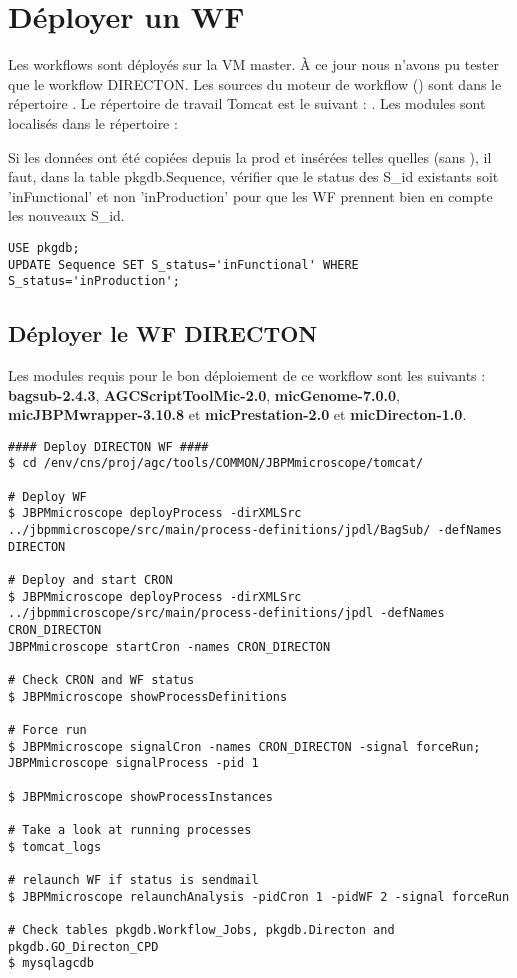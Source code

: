 \section{Déployer un WF} \label{sec:deployer_wf}

Les workflows sont déployés sur la VM master.
À ce jour nous n'avons pu tester que le workflow DIRECTON.
Les sources du moteur de workflow () sont dans le répertoire .
Le répertoire de travail Tomcat est le suivant : .
Les modules sont localisés dans le répertoire : 
\newline

\begin{mycolorbox}
    Si les données ont été copiées depuis la prod et insérées telles quelles (sans ), il faut, dans la table pkgdb.Sequence, vérifier que le status des S\_id existants soit 'inFunctional' et non 'inProduction' pour que les WF prennent bien en compte les nouveaux S\_id.
\end{mycolorbox}

\begin{lstlisting}[style=SQL]
USE pkgdb;
UPDATE Sequence SET S_status='inFunctional' WHERE S_status='inProduction';
\end{lstlisting}

\subsection{Déployer le WF DIRECTON}
Les modules requis pour le bon déploiement de ce workflow sont les suivants : \textbf{bagsub-2.4.3}, \textbf{AGCScriptToolMic-2.0}, \textbf{micGenome-7.0.0}, \textbf{micJBPMwrapper-3.10.8} et \textbf{micPrestation-2.0} et \textbf{micDirecton-1.0}.

\begin{lstlisting}[style=bash]
#### Deploy DIRECTON WF ####
$ cd /env/cns/proj/agc/tools/COMMON/JBPMmicroscope/tomcat/

# Deploy WF
$ JBPMmicroscope deployProcess -dirXMLSrc ../jbpmmicroscope/src/main/process-definitions/jpdl/BagSub/ -defNames DIRECTON

# Deploy and start CRON
$ JBPMmicroscope deployProcess -dirXMLSrc ../jbpmmicroscope/src/main/process-definitions/jpdl -defNames CRON_DIRECTON
JBPMmicroscope startCron -names CRON_DIRECTON

# Check CRON and WF status
$ JBPMmicroscope showProcessDefinitions

# Force run
$ JBPMmicroscope signalCron -names CRON_DIRECTON -signal forceRun; JBPMmicroscope signalProcess -pid 1

$ JBPMmicroscope showProcessInstances

# Take a look at running processes
$ tomcat_logs

# relaunch WF if status is sendmail
$ JBPMmicroscope relaunchAnalysis -pidCron 1 -pidWF 2 -signal forceRun

# Check tables pkgdb.Workflow_Jobs, pkgdb.Directon and pkgdb.GO_Directon_CPD
$ mysqlagcdb
\end{lstlisting}
